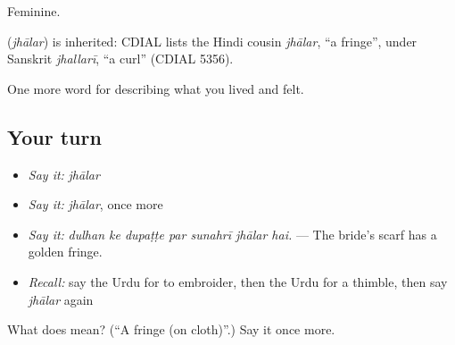 Feminine.

\begin{cousinweb}
\textbf{} (\emph{jhālar}) is inherited: CDIAL lists the Hindi cousin \emph{jhālar}, \textquotedblleft{}a fringe\textquotedblright{}, under Sanskrit \emph{jhallarī}, \textquotedblleft{}a curl\textquotedblright{} (CDIAL 5356).
\end{cousinweb}

\begin{grammarlens}[title={What you've built}]
One more word for describing what you lived and felt.
\end{grammarlens}

\subsection*{Your turn}
\begin{itemize}
\raggedright
  \item \emph{Say it:} \emph{jhālar}
  \item \emph{Say it:} \emph{jhālar}, once more
  \item \emph{Say it:} \emph{dulhan ke dupaṭṭe par sunahrī jhālar hai.} — The bride's scarf has a golden fringe.
  \item \emph{Recall:} say the Urdu for to embroider, then the Urdu for a thimble, then say \emph{jhālar} again
\end{itemize}

\begin{tcolorbox}[breakable,colback=teal!4,colframe=teal!35!black,title={Before you move on}]
What does  mean? (\textquotedblleft{}A fringe (on cloth)\textquotedblright{}.) Say it once more.
\end{tcolorbox}
